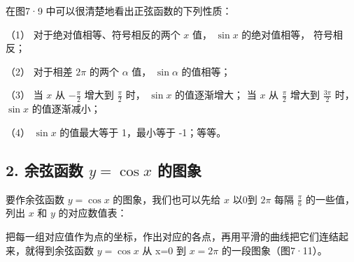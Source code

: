 在图7·9 中可以很清楚地看出正弦函数的下列性质：

（1） 对于绝对值相等、符号相反的两个 \(x\) 值， \(\sin x\)
的绝对值相等， 符号相反；

（2） 对于相差 \(2\pi\) 的两个 \(\alpha\) 值， \(\sin \alpha\)
的值相等；

（3） 当 \(x\) 从 \(-\frac{\pi}{2}\) 增大到 \(\frac{\pi}{2}\) 时，
\(\sin x\) 的值逐渐增大； 当 \(x\) 从 \(\frac{\pi}{2}\) 增大到
\(\frac{3\pi}{2}\) 时， \(\sin x\) 的值逐渐减小；

（4） \(\sin x\) 的值最大等于 1，最小等于 -1；等等。

\subsection{\texorpdfstring{2. 余弦函数 \(y = \cos x\) 的图象}{2. 余弦函数 y = \textbackslash cos x 的图象}}

要作余弦函数 \(y = \cos x\) 的图象，我们也可以先给 \(x\) 以0到 \(2\pi\)
每隔 \(\frac{\pi}{6}\) 的一些值，列出 \(x\) 和 \(y\) 的对应数值表：

{\centering
\small\setlength{\tabcolsep}{3pt}%
\par
}

把每一组对应值作为点的坐标，作出对应的各点，再用平滑的曲线把它们连结起来，就得到余弦函数
\(y=\cos x\) 从 x=0 到 \(x=2\pi\) 的一段图象（图7·11）。

